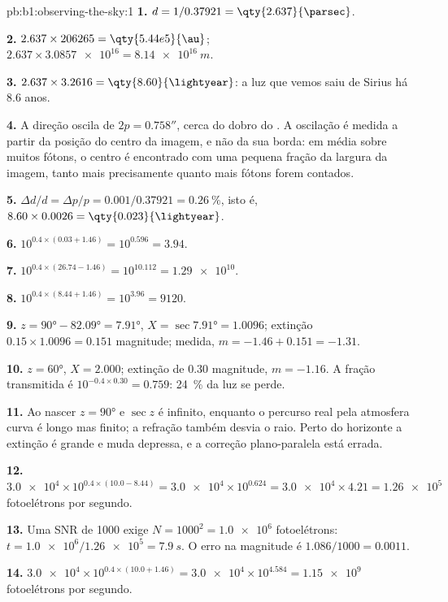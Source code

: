 \begin{solution}{pb:b1:observing-the-sky:1}
\textbf{1.} $d = 1/0.37921 = \qty{2.637}{\parsec}$.

\textbf{2.} $2.637\times206265 = \qty{5.44e5}{\au}$;
$2.637\times\num{3.0857e16} = \qty{8.14e16}{m}$.

\textbf{3.} $2.637\times3.2616 = \qty{8.60}{\lightyear}$: a luz que vemos saiu de
Sirius há 8.6 anos.

\textbf{4.} A direção oscila de $2p = \ang{;;0.758}$, cerca do dobro do
. A oscilação é medida a partir da posição do centro da imagem, e não da sua borda: em média sobre muitos fótons,
o centro é encontrado com uma pequena fração da largura da imagem, tanto mais
precisamente quanto mais fótons forem contados.

\textbf{5.} $\Delta d/d = \Delta p/p = 0.001/0.37921 = \qty{0.26}{\percent}$,
isto é, $8.60\times0.0026 = \qty{0.023}{\lightyear}$.

\textbf{6.} $10^{0.4\times(0.03 + 1.46)} = 10^{0.596} = 3.94$.

\textbf{7.} $10^{0.4\times(26.74 - 1.46)} = 10^{10.112} = \num{1.29e10}$.

\textbf{8.} $10^{0.4\times(8.44 + 1.46)} = 10^{3.96} = \num{9120}$.

\textbf{9.} $z = \ang{90} - \ang{82.09} = \ang{7.91}$, $X = \sec\ang{7.91} =
1.0096$; extinção $0.15\times1.0096 = 0.151$ magnitude; medida,
$m = -1.46 + 0.151 = -1.31$.

\textbf{10.} $z = \ang{60}$, $X = 2.000$; extinção de 0.30 magnitude,
$m = -1.16$. A fração transmitida é $10^{-0.4\times0.30} = 0.759$:
\qty{24}{\percent} da luz se perde.

\textbf{11.} Ao nascer $z = \ang{90}$ e $\sec z$ é infinito, enquanto o
percurso real pela atmosfera curva é longo mas finito; a refração também
desvia o raio. Perto do horizonte a extinção é grande e muda depressa, e a
correção plano-paralela está errada.

\textbf{12.} $\num{3.0e4}\times10^{0.4\times(10.0 - 8.44)} = \num{3.0e4}
\times10^{0.624} = \num{3.0e4}\times4.21 = \num{1.26e5}$ fotoelétrons por
segundo.

\textbf{13.} Uma SNR de 1000 exige $N = 1000^2 = \num{1.0e6}$
fotoelétrons: $t = \num{1.0e6}/\num{1.26e5} = \qty{7.9}{s}$. O erro na
magnitude é $1.086/1000 = \num{0.0011}$.

\textbf{14.} $\num{3.0e4}\times10^{0.4\times(10.0 + 1.46)} = \num{3.0e4}
\times10^{4.584} = \num{1.15e9}$ fotoelétrons por segundo.


\end{solution}
